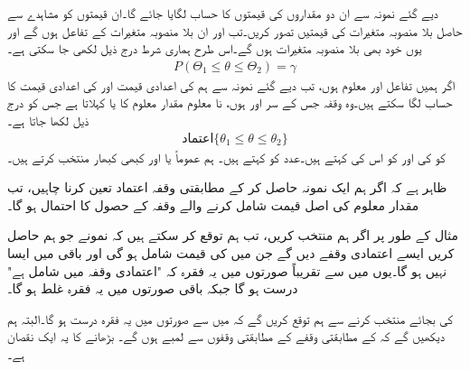 دیے گئے نمونہ  سے ان دو مقداروں کی قیمتوں کا حساب لگایا جائے گا۔ان  قیمتوں کو مشاہدے سے حاصل  بلا منصوبہ متغیرات  کی قیمتیں تصور کریں۔تب  اور  ان بلا منصوبہ متغیرات کے تفاعل ہوں گے اور یوں خود بھی بلا منصوبہ متغیرات ہوں گے۔اس طرح ہماری شرط درج ذیل لکھی جا سکتی ہے۔
\begin{align*}
P(\Theta_1\le \theta \le \Theta_2)=\gamma
\end{align*}
اگر ہمیں تفاعل  اور  معلوم ہوں، تب دیے گئے نمونہ سے ہم  کی  اعدادی قیمت  اور  کی اعدادی قیمت  کا حساب لگا سکتے ہیں۔وہ وقفہ جس کے سر  اور  ہوں، نا معلوم مقدار معلوم  کا   یا  کہلاتا ہے جس کو درج ذیل لکھا جاتا ہے۔
\begin{align*}
\text{اعتماد}\{\theta_1\le \theta\le \theta_2\}
\end{align*}
 کو   کی  اور  کو اس کی   کہتے ہیں۔عدد  کو  کہتے ہیں۔ ہم عموماً  یا  اور کبھی کبھار  منتخب کرتے ہیں۔

ظاہر ہے کہ اگر ہم ایک نمونہ حاصل کر کے مطابقتی وقفہ اعتماد تعین کرنا چاہیں، تب مقدار معلوم کی اصل قیمت شامل کرنے والے وقفہ کے حصول کا احتمال  ہو گا۔

مثال کے طور پر اگر ہم  منتخب  کریں، تب ہم توقع کر سکتے ہیں کہ  نمونے جو ہم حاصل کریں ایسے اعتمادی وقفے دیں گے جن میں  کی قیمت شامل ہو گی اور باقی  میں ایسا نہیں ہو گا۔یوں  میں سے تقریباً  صورتوں میں  یہ فقرہ کہ "اعتمادی وقفہ میں  شامل ہے"  درست ہو گا جبکہ باقی صورتوں میں یہ فقرہ غلط ہو گا۔

 کی بجائے  منتخب کرنے سے ہم توقع کریں گے کہ  میں سے  صورتوں میں یہ فقرہ درست ہو گا۔البتہ ہم دیکھیں گے کہ  کے مطابقتی وقفے  کے مطابقتی وقفوں سے  لمبے ہوں گے۔ بڑھانے کا یہ ایک نقصان ہے۔ 

